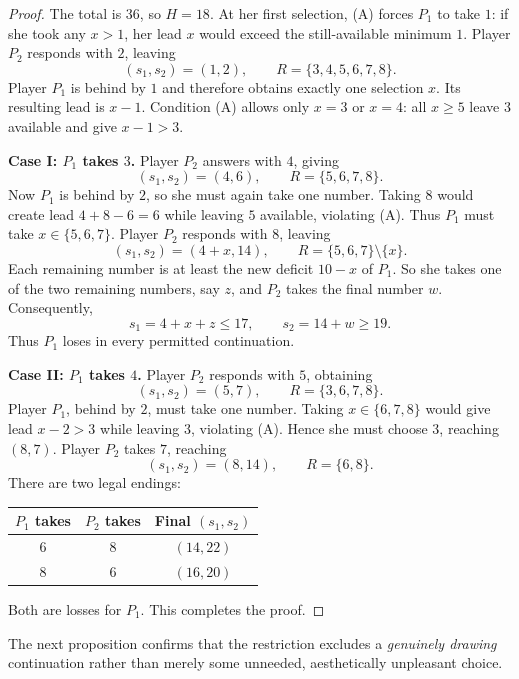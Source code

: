 \documentclass[11pt,a4paper]{article}
\theoremstyle{definition}
\theoremstyle{remark}
\begin{document}
\begin{proof}
The total is $36$, so $H=18$.  At her first selection, (A) forces
$P_1$ to take $1$: if she took any $x>1$, her lead $x$ would exceed
the still-available minimum $1$.  Player $P_2$ responds with $2$,
leaving
\[
(s_1,s_2)=(1,2),\qquad R=\{3,4,5,6,7,8\}.
\]
Player $P_1$ is behind by $1$ and therefore obtains exactly one
selection $x$.  Its resulting lead is $x-1$.  Condition (A) allows
only $x=3$ or $x=4$: all $x\ge5$ leave $3$ available and give
$x-1>3$.

\smallskip\noindent\textbf{Case I: $P_1$ takes $3$.}
Player $P_2$ answers with $4$, giving
\[
(s_1,s_2)=(4,6),\qquad R=\{5,6,7,8\}.
\]
Now $P_1$ is behind by $2$, so she must again take one number.
Taking $8$ would create lead $4+8-6=6$ while leaving $5$
available, violating (A).  Thus $P_1$ must take
$x\in\{5,6,7\}$.  Player $P_2$ responds with $8$, leaving
\[
(s_1,s_2)=(4+x,14),\qquad
R=\{5,6,7\}\setminus\{x\}.
\]
Each remaining number is at least the new deficit $10-x$ of $P_1$.
So she takes one of the two remaining numbers, say $z$, and $P_2$
takes the final number $w$.  Consequently,
\[
s_1=4+x+z\le17,
\qquad
s_2=14+w\ge19.
\]
Thus $P_1$ loses in every permitted continuation.

\smallskip\noindent\textbf{Case II: $P_1$ takes $4$.}
Player $P_2$ responds with $5$, obtaining
\[
(s_1,s_2)=(5,7),\qquad R=\{3,6,7,8\}.
\]
Player $P_1$, behind by $2$, must take one number.  Taking
$x\in\{6,7,8\}$ would give lead $x-2>3$ while leaving $3$,
violating (A).  Hence she must choose $3$, reaching $(8,7)$.
Player $P_2$ takes $7$, reaching
\[
(s_1,s_2)=(8,14),\qquad R=\{6,8\}.
\]
There are two legal endings:
\begin{center}
\begin{tabular}{@{}ccc@{}}
\toprule
$P_1$ takes & $P_2$ takes & Final $(s_1,s_2)$\\
\midrule
$6$ & $8$ & $(14,22)$\\
$8$ & $6$ & $(16,20)$\\
\bottomrule
\end{tabular}
\end{center}
Both are losses for $P_1$.  This completes the proof.
\end{proof}

The next proposition confirms that the restriction excludes a
\emph{genuinely drawing} continuation rather than merely some
unneeded, aesthetically unpleasant choice.
\end{document}
